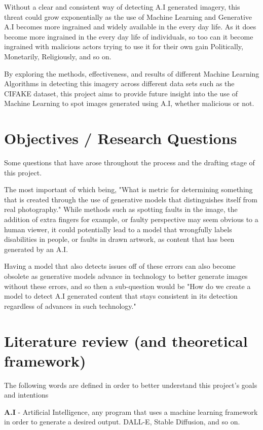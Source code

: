 \documentclass[12pt,letter]{article}
\begin{document}
Without a clear and consistent way of detecting A.I generated imagery, this threat could grow exponentially as the use of Machine Learning and Generative A.I becomes more ingrained and widely available in the every day life. \cite{brundagem2018} As it does become more ingrained in the every day life of individuals, so too can it become ingrained with malicious actors trying to use it for their own gain Politically, Monetarily, Religiously, and so on. 

By exploring the methods, effectiveness, and results of different Machine Learning Algorithms in detecting this imagery across different data sets such as the CIFAKE \cite{birdj2023} dataset, this project aims to provide future insight into the use of Machine Learning to spot images generated using A.I, whether malicious or not.

\section{Objectives / Research Questions}\label{}

Some questions that have arose throughout the process and the drafting stage of this project.

The most important of which being, "What is metric for determining something that is created through the use of generative models that distinguishes itself from real photography." While methods such as spotting faults in the image, the addition of extra fingers for example, or faulty perspective may seem obvious to a human viewer, it could potentially lead to a model that wrongfully labels disabilities in people, or faults in drawn artwork, as content that has been generated by an A.I. 

Having a model that also detects issues off of these errors can also become obsolete as generative models advance in technology to better generate images without these errors, and so then a sub-question would be "How do we create a model to detect A.I generated content that stays consistent in its detection regardless of advances in such technology."

\section{Literature review (and theoretical framework)}

The following words are defined in order to better understand this project's goals and intentions

\textbf{A.I} - Artificial Intelligence, any program that uses a machine learning framework in order to generate a desired output. DALL-E, Stable Diffusion, and so on.
\end{document}
